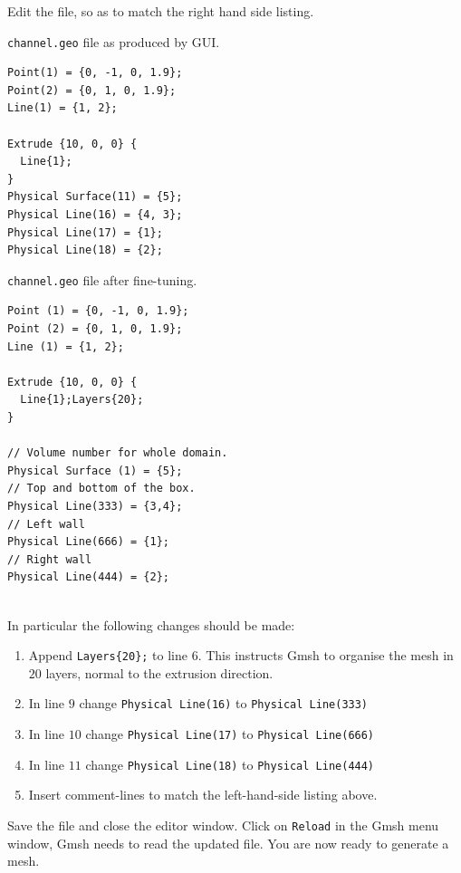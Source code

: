 Edit the file, so as to match the right hand side listing.\\
\begin{minipage}[t]{0.48\textwidth}
\begin{center}
\lstinline+channel.geo+ file as produced by
GUI.
\end{center}
\lstset{numbers=left}
\begin{lstlisting}
Point(1) = {0, -1, 0, 1.9};
Point(2) = {0, 1, 0, 1.9};
Line(1) = {1, 2};

Extrude {10, 0, 0} {
  Line{1};
}
Physical Surface(11) = {5};
Physical Line(16) = {4, 3};
Physical Line(17) = {1};
Physical Line(18) = {2};
\end{lstlisting}
\lstset{numbers=none}
\end{minipage}
\hfill
\begin{minipage}[t]{0.48\textwidth}
\begin{center}
\lstinline+channel.geo+ file after
fine-tuning.
\end{center}
\lstset{numbers=left}
\begin{lstlisting}
Point (1) = {0, -1, 0, 1.9};
Point (2) = {0, 1, 0, 1.9};
Line (1) = {1, 2};

Extrude {10, 0, 0} {
  Line{1};Layers{20};
}

// Volume number for whole domain.
Physical Surface (1) = {5};
// Top and bottom of the box.
Physical Line(333) = {3,4};
// Left wall
Physical Line(666) = {1};
// Right wall
Physical Line(444) = {2};
\end{lstlisting}
\lstset{numbers=none}
\end{minipage}\\
In particular the following changes should be made:
\begin{enumerate}
  \item Append \verb$Layers{20};$ to line $6$. This instructs Gmsh to organise the mesh in $20$
        layers, normal to the extrusion direction.
  \item In line $9$ change \lstinline{Physical Line(16)} to \lstinline{Physical Line(333)}
  \item In line $10$ change \lstinline{Physical Line(17)} to \lstinline{Physical Line(666)}
  \item In line $11$ change \lstinline{Physical Line(18)} to \lstinline{Physical Line(444)}
  \item Insert comment-lines to match the left-hand-side listing above.
\end{enumerate}
Save the file and close the editor window. Click on \lstinline+Reload+ in the Gmsh menu window, Gmsh needs to read the updated file. You are now ready to generate a mesh.


